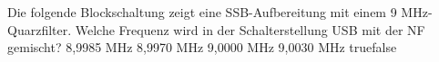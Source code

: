     {Die folgende Blockschaltung zeigt eine SSB-Aufbereitung mit einem 9 MHz-Quarzfilter. Welche Frequenz wird in der Schalterstellung USB mit der NF gemischt?}
    {8,9985 MHz}
    {8,9970 MHz}
    {9,0000 MHz}
    {9,0030 MHz}
    {true}{false}